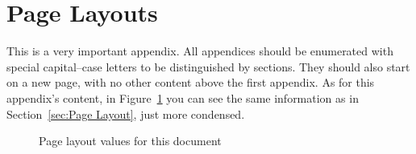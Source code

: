 \documentclass[a4paper, 11pt]{article}
\numberwithin{equation}{section}
\theoremstyle{definition}
\begin{document}
	\section{Page Layouts}\label{app:a}
	This is a very important appendix. All appendices should be enumerated with special capital--case letters to be distinguished by sections. They should also start on a new page, with no other content above the first appendix. As for this appendix's content, in Figure~\ref{fig:ptrs} you can see the same information as in Section~\ref{sec:Page Layout}, just more condensed.
	
	\begin{figure}[!htb]
		\currentpage
		\pagedesign
		\caption{Page layout values for this document} \label{fig:ptrs}
	\end{figure}
\end{document}
